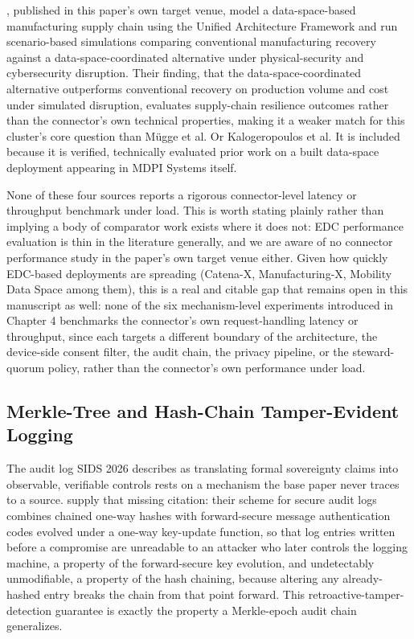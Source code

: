 \cite{norikane2025}, published in this paper's own target venue, model a data-space-based manufacturing supply chain using the Unified Architecture Framework and run scenario-based simulations comparing conventional manufacturing recovery against a data-space-coordinated alternative under physical-security and cybersecurity disruption. Their finding, that the data-space-coordinated alternative outperforms conventional recovery on production volume and cost under simulated disruption, evaluates supply-chain resilience outcomes rather than the connector's own technical properties, making it a weaker match for this cluster's core question than Mügge et al. Or Kalogeropoulos et al. It is included because it is verified, technically evaluated prior work on a built data-space deployment appearing in MDPI Systems itself.

None of these four sources reports a rigorous connector-level latency or throughput benchmark under load. This is worth stating plainly rather than implying a body of comparator work exists where it does not: EDC performance evaluation is thin in the literature generally, and we are aware of no connector performance study in the paper's own target venue either. Given how quickly EDC-based deployments are spreading (Catena-X, Manufacturing-X, Mobility Data Space among them), this is a real and citable gap that remains open in this manuscript as well: none of the six mechanism-level experiments introduced in Chapter 4 benchmarks the connector's own request-handling latency or throughput, since each targets a different boundary of the architecture, the device-side consent filter, the audit chain, the privacy pipeline, or the steward-quorum policy, rather than the connector's own performance under load.

\subsection{Merkle-Tree and Hash-Chain Tamper-Evident Logging}

The audit log SIDS 2026 describes as translating formal sovereignty claims into observable, verifiable controls rests on a mechanism the base paper never traces to a source. \cite{schneier1999} supply that missing citation: their scheme for secure audit logs combines chained one-way hashes with forward-secure message authentication codes evolved under a one-way key-update function, so that log entries written before a compromise are unreadable to an attacker who later controls the logging machine, a property of the forward-secure key evolution, and undetectably unmodifiable, a property of the hash chaining, because altering any already-hashed entry breaks the chain from that point forward. This retroactive-tamper-detection guarantee is exactly the property a Merkle-epoch audit chain generalizes.

